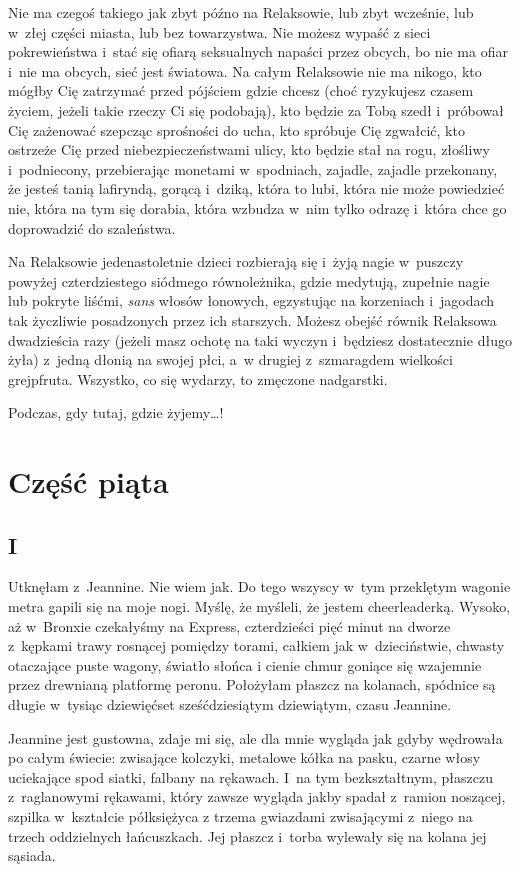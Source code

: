 \documentclass[oneside,polish,12pt,sfheadings]{mwbk}
\begin{document}
Nie ma czegoś takiego jak zbyt późno na Relaksowie, lub zbyt wcześnie,
lub w~złej części miasta, lub bez towarzystwa. Nie możesz wypaść z
sieci pokrewieństwa i~stać się ofiarą seksualnych napaści przez obcych,
bo nie ma ofiar i~nie ma obcych, sieć jest światowa. Na całym Relaksowie
nie ma nikogo, kto mógłby Cię zatrzymać przed pójściem gdzie chcesz
(choć ryzykujesz czasem życiem, jeżeli takie rzeczy Ci się podobają),
kto będzie za Tobą szedł i~próbował Cię zażenować szepcząc sprośności
do ucha, kto spróbuje Cię zgwałcić, kto ostrzeże Cię przed niebezpieczeństwami
ulicy, kto będzie stał na rogu, złośliwy i~podniecony, przebierając
monetami w~spodniach, zajadle, zajadle przekonany, że jesteś tanią
lafiryndą, gorącą i~dziką, która to lubi, która nie może powiedzieć
nie, która na tym się dorabia, która wzbudza w~nim tylko odrazę i~która chce go doprowadzić do szaleństwa.

Na Relaksowie jedenastoletnie dzieci rozbierają się i~żyją nagie w~puszczy powyżej czterdziestego siódmego równoleżnika, gdzie medytują,
zupełnie nagie lub pokryte liśćmi, \textit{sans} włosów łonowych, egzystując
na korzeniach i~jagodach tak życzliwie posadzonych przez ich starszych.
Możesz obejść równik Relaksowa dwadzieścia razy (jeżeli masz ochotę
na taki wyczyn i~będziesz dostatecznie długo żyła) z~jedną dłonią
na swojej płci, a~w drugiej z~szmaragdem wielkości grejpfruta. Wszystko,
co się wydarzy, to zmęczone nadgarstki.

Podczas, gdy tutaj, gdzie żyjemy\ldots!

\part*{Część piąta}

\chapter{I}

Utknęłam z~Jeannine. Nie wiem jak. Do tego wszyscy w~tym przeklętym
wagonie metra gapili się na moje nogi. Myślę, że myśleli, że jestem
cheerleaderką. Wysoko, aż w~Bronxie czekałyśmy na Express, czterdzieści
pięć minut na dworze z~kępkami trawy rosnącej pomiędzy torami, całkiem
jak w~dzieciństwie, chwasty otaczające puste wagony, światło słońca
i cienie chmur goniące się wzajemnie przez drewnianą platformę peronu.
Położyłam płaszcz na kolanach, spódnice są długie w~tysiąc dziewięćset
sześćdziesiątym dziewiątym, czasu Jeannine.

Jeannine jest gustowna, zdaje mi się, ale dla mnie wygląda jak gdyby
wędrowała po całym świecie: zwisające kolczyki, metalowe kółka na
pasku, czarne włosy uciekające spod siatki, falbany na rękawach. I~na tym bezkształtnym, płaszczu z~raglanowymi rękawami, który zawsze
wygląda jakby spadał z~ramion noszącej, szpilka w~kształcie półksiężyca
z trzema gwiazdami zwisającymi z~niego na trzech oddzielnych łańcuszkach.
Jej płaszcz i~torba wylewały się na kolana jej sąsiada.
\end{document}

